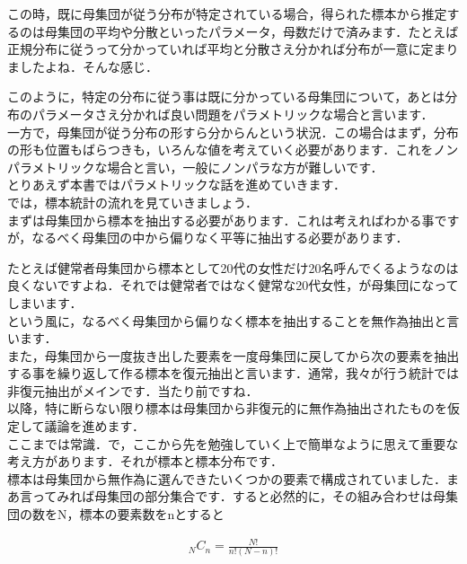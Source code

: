 \documentclass[11pt,a4paper,uplatex]{ujreport} 	%
\begin{document}
この時，既に母集団が従う分布が特定されている場合，得られた標本から推定するのは母集団の平均や分散といったパラメータ，母数だけで済みます．たとえば正規分布に従うって分かっていれば平均と分散さえ分かれば分布が一意に定まりましたよね．そんな感じ．

このように，特定の分布に従う事は既に分かっている母集団について，あとは分布のパラメータさえ分かれば良い問題をパラメトリックな場合と言います．\\

一方で，母集団が従う分布の形すら分からんという状況．この場合はまず，分布の形も位置もばらつきも，いろんな値を考えていく必要があります．これをノンパラメトリックな場合と言い，一般にノンパラな方が難しいです．\\

とりあえず本書ではパラメトリックな話を進めていきます．\\

では，標本統計の流れを見ていきましょう．\\

まずは母集団から標本を抽出する必要があります．これは考えればわかる事ですが，なるべく母集団の中から偏りなく平等に抽出する必要があります．

たとえば健常者母集団から標本として20代の女性だけ20名呼んでくるようなのは良くないですよね．それでは健常者ではなく健常な20代女性，が母集団になってしまいます．\\

という風に，なるべく母集団から偏りなく標本を抽出することを無作為抽出と言います．\\

また，母集団から一度抜き出した要素を一度母集団に戻してから次の要素を抽出する事を繰り返して作る標本を復元抽出と言います．通常，我々が行う統計では非復元抽出がメインです．当たり前ですね．\\

以降，特に断らない限り標本は母集団から非復元的に無作為抽出されたものを仮定して議論を進めます．\\

ここまでは常識．で，ここから先を勉強していく上で簡単なように思えて重要な考え方があります．それが標本と標本分布です．\\

標本は母集団から無作為に選んできたいくつかの要素で構成されていました．まあ言ってみれば母集団の部分集合です．すると必然的に，その組み合わせは母集団の数をN，標本の要素数をnとすると

\begin{align}
  {}_N C_n = \frac{N!}{n!(N-n)!}
\end{align}
\end{document}
